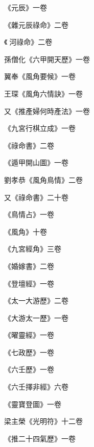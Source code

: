 \begin{pinyinscope}
 《元辰》一卷



 《雜元辰祿命》二卷



 《河祿命》二卷



 孫僧化《六甲開天歷》一卷



 翼奉《風角要候》一卷



 王琛《風角六情訣》一卷



 又《推產婦何時產法》一卷



 《九宮行棋立成》一卷



 《祿命書》二卷



 《遁甲開山圖》一卷



 劉孝恭《風角鳥情》二卷



 又《祿命書》二十卷



 《鳥情占》一卷



 《風角》十卷



 《九宮經角》三卷



 《婚嫁書》二卷



 《登壇經》一卷



 《太一大游歷》二卷



 《大游太一歷》一卷



 《曜靈經》一卷



 《七政歷》一卷



 《六壬歷》一卷



 《六壬擇非經》六卷



 《靈寶登圖》一卷



 梁主榮《光明符》十二卷



 《推二十四氣歷》一卷




\end{pinyinscope}
